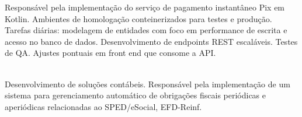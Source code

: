 \documentclass[10pt,a4paper,ragged2e]{altacv}
\begin{document}
\divider

Responsável pela implementação do serviço de pagamento instantâneo Pix em Kotlin. Ambientes de homologação conteinerizados para testes e produção. Tarefas diárias: modelagem de entidades com foco em performance de escrita e acesso no banco de dados. Desenvolvimento de endpoints REST escaláveis. Testes de QA. Ajustes pontuais em front end que consome a API.
\\

\newline
{}
\\

\divider


Desenvolvimento de soluções contábeis. Responsável pela implementação de um sistema para gerenciamento automático de obrigações fiscais periódicas e aperiódicas relacionadas ao SPED/eSocial, EFD-Reinf.
\\

\\

%
%

\clearpage






\printbibliography[heading=pubtype,title={\printinfo{\faGroup}{Conference Proceedings}},type=inproceedings]

\end{document}
